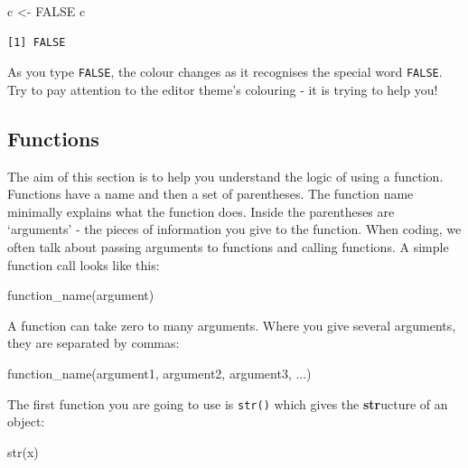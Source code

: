\documentclass[
  letterpaper,
  DIV=11,
  numbers=noendperiod]{scrreprt}
\newenvironment{Shaded}{\begin{snugshade}}{\end{snugshade}}
\newcommand{\ConstantTok}[1]{\textcolor[rgb]{0.56,0.35,0.01}{#1}}
\newcommand{\FunctionTok}[1]{\textcolor[rgb]{0.28,0.35,0.67}{#1}}
\newcommand{\NormalTok}[1]{\textcolor[rgb]{0.00,0.23,0.31}{#1}}
\newcommand{\OtherTok}[1]{\textcolor[rgb]{0.00,0.23,0.31}{#1}}
\begin{document}
\begin{Shaded}
\begin{Highlighting}[]
\NormalTok{c }\OtherTok{\textless{}{-}} \ConstantTok{FALSE}
\NormalTok{c}
\end{Highlighting}
\end{Shaded}

\begin{verbatim}
[1] FALSE
\end{verbatim}

As you type \texttt{FALSE}, the colour changes as it recognises the
special word \texttt{FALSE}. Try to pay attention to the editor theme's
colouring - it is trying to help you!

\hypertarget{functions}{%
\subsection{Functions}\label{functions}}

The aim of this section is to help you understand the logic of using a
function. Functions have a name and then a set of parentheses. The
function name minimally explains what the function does. Inside the
parentheses are `arguments' - the pieces of information you give to the
function. When coding, we often talk about passing arguments to
functions and calling functions. A simple function call looks like this:

\begin{Shaded}
\begin{Highlighting}[]
\FunctionTok{function\_name}\NormalTok{(argument)}
\end{Highlighting}
\end{Shaded}

A function can take zero to many arguments. Where you give several
arguments, they are separated by commas:

\begin{Shaded}
\begin{Highlighting}[]
\FunctionTok{function\_name}\NormalTok{(argument1, argument2, argument3, ...)}
\end{Highlighting}
\end{Shaded}

The first function you are going to use is \texttt{str()} which gives
the \textbf{str}ucture of an object:

\begin{Shaded}
\begin{Highlighting}[]
\FunctionTok{str}\NormalTok{(x)}
\end{Highlighting}
\end{Shaded}
\end{document}
